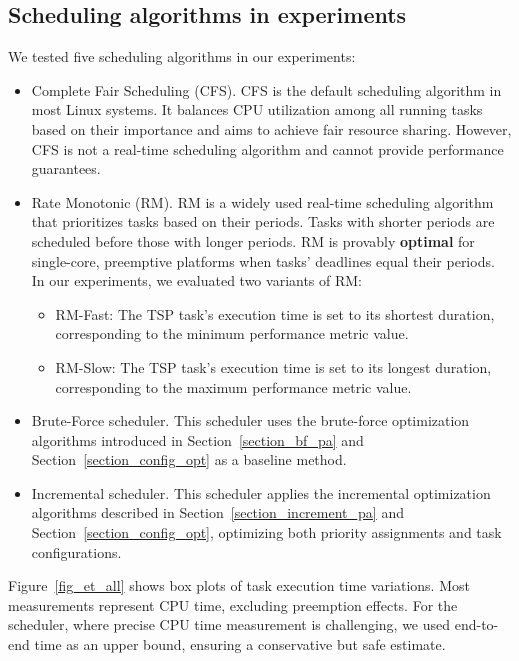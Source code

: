 	\subsection{Scheduling algorithms in experiments}
    We tested five scheduling algorithms in our experiments:
	\begin{itemize}
		\item Complete Fair Scheduling (CFS). CFS is the default scheduling algorithm in most Linux systems. It balances CPU utilization among all running tasks based on their importance and aims to achieve fair resource sharing. However, CFS is not a real-time scheduling algorithm and cannot provide performance guarantees.
		\item Rate Monotonic (RM). RM is a widely used real-time scheduling algorithm that prioritizes tasks based on their periods. Tasks with shorter periods are scheduled before those with longer periods. RM is provably \textbf{optimal} for single-core, preemptive platforms when tasks’ deadlines equal their periods.  
    In our experiments, we evaluated two variants of RM:     \begin{itemize}
        \item RM-Fast: The TSP task's execution time is set to its shortest duration, corresponding to the minimum performance metric value.
        \item RM-Slow: The TSP task's execution time is set to its longest duration, corresponding to the maximum performance metric value.
    \end{itemize}
		\item Brute-Force scheduler. 
        This scheduler uses the brute-force optimization algorithms introduced in Section~\ref{section_bf_pa} and Section~\ref{section_config_opt} as a baseline method.
		\item Incremental scheduler. 
        This scheduler applies the incremental optimization algorithms described in Section~\ref{section_increment_pa} and Section~\ref{section_config_opt}, optimizing both priority assignments and task configurations.
	\end{itemize}
	
    
    Figure~\ref{fig_et_all} shows box plots of task execution time variations. Most measurements represent CPU time, excluding preemption effects. For the scheduler, where precise CPU time measurement is challenging, we used end-to-end time as an upper bound, ensuring a conservative but safe estimate.

